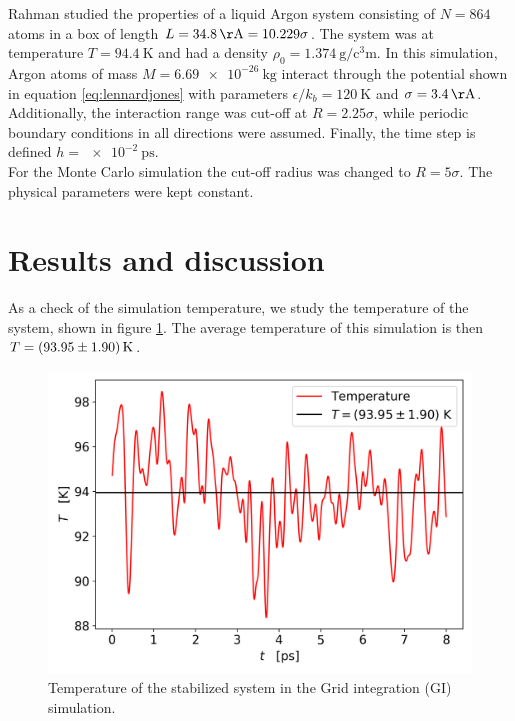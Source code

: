 \documentclass[%
aps,
pra,%
amsmath,amssymb,
preprint,%
reprint,%
notitlepage,
a4paper]{revtex4-1}
\begin{document}
Rahman\cite{Rahman1964} studied the properties of a liquid Argon system consisting of $N=864$ atoms in a box of length $L = \SI{34.8}{\AA} = 10.229\sigma$. The system was at temperature $T = \SI{94.4}{\kelvin}$ and had a density $\rho_0 = \SI{1.374}{\gram\per\cubic\centi\meter}$. In this simulation, Argon atoms of mass $M = \SI{6.69e-26}{\kilogram}$ interact through the potential shown in equation \ref{eq:lennardjones} with parameters $\epsilon/k_b = \SI{120}{\kelvin}$ and $\sigma = \SI{3.4}{\AA}$. Additionally, the interaction range was cut-off at $R = 2.25\sigma$, while periodic boundary conditions in all directions were assumed. Finally, the time step is defined $h = \SI{e-2}{\pico\second}$.\\
For the Monte Carlo simulation the cut-off radius was changed to $R = 5\sigma$. The physical parameters were kept constant.
\section{Results and discussion\label{sec:results}}
As a check of the simulation temperature, we study the temperature of the system, shown in figure \ref{fig:Tvst}. The average temperature of this simulation is then $T = \SI{93.95\pm1.90}{\kelvin}$.
\begin{figure}[t]
	\centering
	\includegraphics[width=0.99\linewidth]{../task2/results/Tvst}
	\caption{Temperature of the stabilized system in the Grid integration (GI) simulation.}
	\label{fig:Tvst}
\end{figure}
\end{document}
